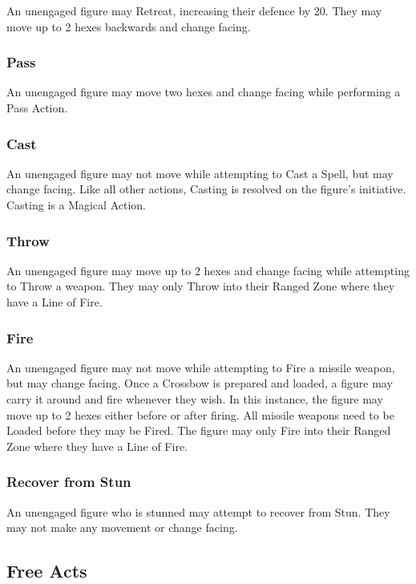 \begin{multicols*}{3}
An unengaged figure may Retreat, increasing their defence by 20. They
may move up to 2 hexes backwards and change facing.

\subsubsection{Pass}

An unengaged figure may move two hexes and change facing while
performing a Pass Action.

\subsubsection{Cast}

An unengaged figure may not move while attempting to Cast a Spell, but
may change facing. Like all other actions, Casting is resolved on the
figure's initiative. Casting is a Magical Action.

\subsubsection{Throw}

An unengaged figure may move up to 2 hexes and change facing while
attempting to Throw a weapon. They may only Throw into their Ranged
Zone where they have a Line of Fire.

\subsubsection{Fire}

An unengaged figure may not move while attempting to Fire a missile
weapon, but may change facing. Once a Crossbow is prepared and loaded,
a figure may carry it around and fire whenever they wish. In this
instance, the figure may move up to 2 hexes either before or after
firing. All missile weapons need to be Loaded before they may be
Fired. The figure may only Fire into their Ranged Zone where they have
a Line of Fire.

\subsubsection{Recover from Stun}

An unengaged figure who is stunned may attempt to recover from Stun.
They may not make any movement or change facing.

\subsection{Free Acts}
\label{combat:free}


\end{multicols*}
